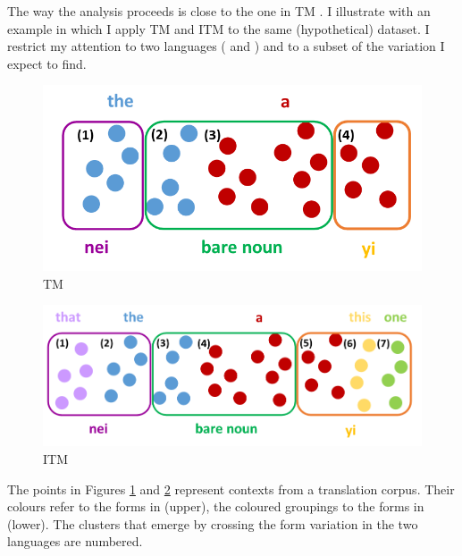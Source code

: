 \documentclass[output=paper,
modfonts
]{langscibook}
\begin{document}
The way the analysis proceeds is close to the one in TM \citep[e.g.][]{deSwart2017}. I illustrate with an example in which I apply TM and ITM to the same (hypothetical) dataset. I restrict my attention to two languages ( and ) and to a subset of the variation I expect to find.

\begin{figure}[t]
\includegraphics[height=.2\textheight]{figures/TM.png}
\caption{TM}
\label{fig:lebruyn:3}
\end{figure}

\begin{figure}[t]
	\includegraphics[height=.2\textheight]{figures/ITM.png}
	\caption{ITM}
	\label{fig:lebruyn:4}
\end{figure}

The points in Figures \ref{fig:lebruyn:3} and \ref{fig:lebruyn:4} represent contexts from a translation corpus. Their colours refer to the forms in  (upper), the coloured groupings to the forms in  (lower). The clusters that emerge by crossing the form variation in the two languages are numbered.
\end{document}
